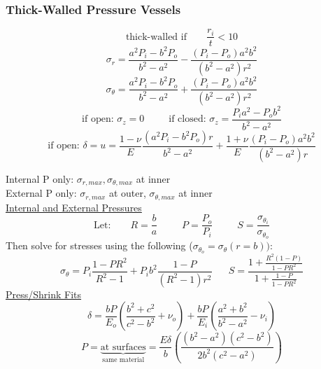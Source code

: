 \documentclass[twocolumn, 12pt]{article}    %
\begin{document}
\subsubsection*{Thick-Walled Pressure Vessels}
\begin{equation*}
    \text{thick-walled if } \hspace{20pt} \frac{r_i}{t} <10
\end{equation*}
\begin{equation*}
    \sigma_r = \frac{a^2P_i - b^2P_o}{ b^2-a^2} - \frac{(P_i - P_o)a^2b^2}{ (b^2-a^2)r^2}
\end{equation*}
\begin{equation*}
    \sigma_\theta = \frac{a^2P_i - b^2P_o}{ b^2-a^2} + \frac{(P_i - P_o)a^2b^2}{ (b^2-a^2)r^2}
\end{equation*}
\begin{equation*}
    \text{if open: } \sigma_z=0 \hspace{30pt} \text{if closed: } \sigma_z = \frac{P_ia^2 - P_ob^2}{b^2-a^2}
\end{equation*}
\begin{equation*}
    \text{if open: } \delta = u = \frac{1-\nu}{E} \frac{(a^2P_i- b^2P_o)r}{b^2-a^2} + \frac{1+\nu}{E} \frac{(P_i-P_o) a^2b^2}{(b^2- a^2)r}
\end{equation*}

Internal P only: \(\sigma_{r,max} , \sigma_{\theta,max}\) at inner\\
External P only: \(\sigma_{r,max}\) at outer, \(\sigma_{\theta,max} \) at inner\\

\underline{Internal and External Pressures}\\
\begin{equation*}
    \text{Let: } \hspace{20pt} R = \frac{b}{a} \hspace{30pt} P = \frac{P_o}{P_i} \hspace{30pt} S = \frac{\sigma_{\theta_i}}{\sigma_{\theta_o}}
\end{equation*}
Then solve for stresses using the following (\(\sigma_{\theta_o} = \sigma_\theta(r=b))\):  
\begin{equation*}
    \sigma_\theta = P_i \frac{1-PR^2}{R^2-1} + P_ib^2 \frac{1- P}{(R^2-1)r^2} \hspace{20pt} S = \frac{1+ \frac{R^2(1-P)}{1-PR^2}} { 1 + \frac{1-P}{1-PR^2}}
\end{equation*}
\underline{Press/Shrink Fits}\\
\begin{equation*}
    \delta = \frac{bP}{E_o} \left( \frac{b^2 + c^2}{c^2 - b^2} + \nu_o \right) + \frac{bP}{E_i} \left( \frac{a^2 +b^2}{b^2-a^2} -\nu_i \right)
\end{equation*}
\begin{equation*}
    P = \underbrace{\text{at surfaces}}_\text{same material}= \frac{E\delta}{b} \left( \frac{(b^2-a^2 ) (c^2-b^2)}{2b^2(c^2-a^2)} \right)
\end{equation*}
\end{document}
